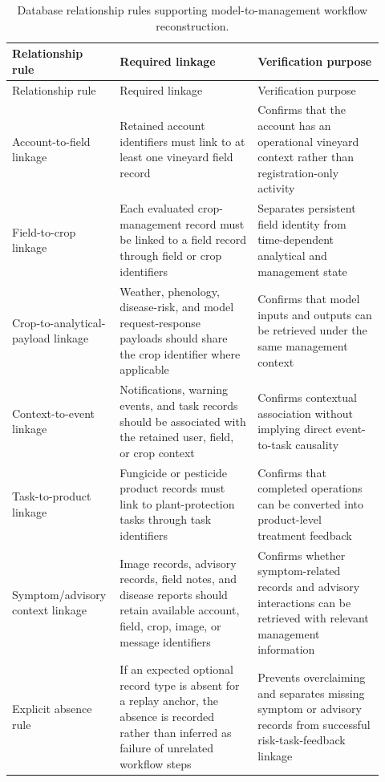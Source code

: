 \documentclass[12pt]{article}
\begin{document}
\begingroup
\setlength{\tabcolsep}{3pt}
\renewcommand{\arraystretch}{1.12}
\begin{longtable}{@{}L{0.23\linewidth} L{0.36\linewidth} L{0.33\linewidth}@{}}
\caption{Database relationship rules supporting model-to-management workflow reconstruction.}\label{tab:supp_database_relationship_rules}\\
\toprule
Relationship rule & Required linkage & Verification purpose \\
\midrule
\endfirsthead
\toprule
Relationship rule & Required linkage & Verification purpose \\
\midrule
\endhead
Account-to-field linkage & Retained account identifiers must link to at least one vineyard field record & Confirms that the account has an operational vineyard context rather than registration-only activity \\
Field-to-crop linkage & Each evaluated crop-management record must be linked to a field record through field or crop identifiers & Separates persistent field identity from time-dependent analytical and management state \\
Crop-to-analytical-payload linkage & Weather, phenology, disease-risk, and model request-response payloads should share the crop identifier where applicable & Confirms that model inputs and outputs can be retrieved under the same management context \\
Context-to-event linkage & Notifications, warning events, and task records should be associated with the retained user, field, or crop context & Confirms contextual association without implying direct event-to-task causality \\
Task-to-product linkage & Fungicide or pesticide product records must link to plant-protection tasks through task identifiers & Confirms that completed operations can be converted into product-level treatment feedback \\
Symptom/advisory context linkage & Image records, advisory records, field notes, and disease reports should retain available account, field, crop, image, or message identifiers & Confirms whether symptom-related records and advisory interactions can be retrieved with relevant management information \\
Explicit absence rule & If an expected optional record type is absent for a replay anchor, the absence is recorded rather than inferred as failure of unrelated workflow steps & Prevents overclaiming and separates missing symptom or advisory records from successful risk-task-feedback linkage \\
\bottomrule
\end{longtable}
\endgroup
\end{document}
